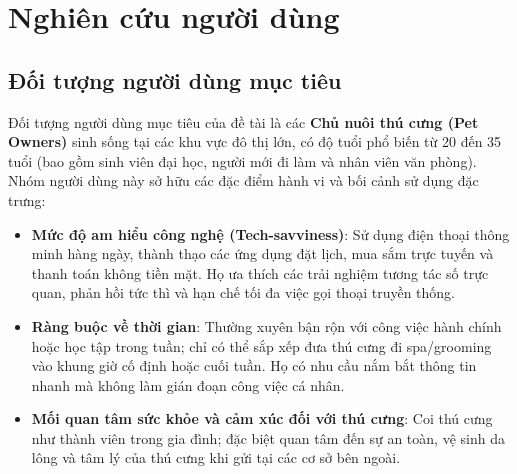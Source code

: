 \section{Nghiên cứu người dùng}

\subsection{Đối tượng người dùng mục tiêu}
Đối tượng người dùng mục tiêu của đề tài là các \textbf{Chủ nuôi thú cưng (Pet Owners)} sinh sống tại các khu vực đô thị lớn, có độ tuổi phổ biến từ 20 đến 35 tuổi (bao gồm sinh viên đại học, người mới đi làm và nhân viên văn phòng). Nhóm người dùng này sở hữu các đặc điểm hành vi và bối cảnh sử dụng đặc trưng:
\begin{itemize}
    \item \textbf{Mức độ am hiểu công nghệ (Tech-savviness)}: Sử dụng điện thoại thông minh hàng ngày, thành thạo các ứng dụng đặt lịch, mua sắm trực tuyến và thanh toán không tiền mặt. Họ ưa thích các trải nghiệm tương tác số trực quan, phản hồi tức thì và hạn chế tối đa việc gọi thoại truyền thống.
    \item \textbf{Ràng buộc về thời gian}: Thường xuyên bận rộn với công việc hành chính hoặc học tập trong tuần; chỉ có thể sắp xếp đưa thú cưng đi spa/grooming vào khung giờ cố định hoặc cuối tuần. Họ có nhu cầu nắm bắt thông tin nhanh mà không làm gián đoạn công việc cá nhân.
    \item \textbf{Mối quan tâm sức khỏe và cảm xúc đối với thú cưng}: Coi thú cưng như thành viên trong gia đình; đặc biệt quan tâm đến sự an toàn, vệ sinh da lông và tâm lý của thú cưng khi gửi tại các cơ sở bên ngoài.
\end{itemize}

